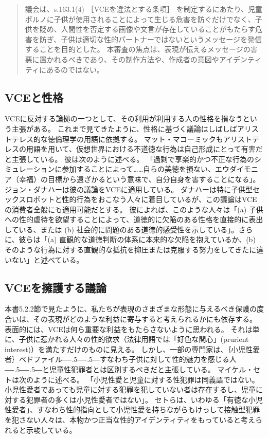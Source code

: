 \documentclass[paper=a4,book,openany]{jlreq}
\def\DDASH{―\kern-.5\zw―\kern-.5\zw―} %
\begin{document}
\begin{quote}
議会は、s.163.1(4) ［VCEを違法とする条項］ を制定するにあたり、児童ポルノに子供が使用されることによって生じる危害を防ぐだけでなく、子供を貶め、人間性を否定する画像や文言が存在していることがもたらす危害を防ぎ、子供は適切な性的パートナーではないというメッセージを発信することを目的とした。
本審査の焦点は、表現が伝えるメッセージの害悪に置かれるべきであり、その制作方法や、作成者の意図やアイデンティティにあるのではない。
\end{quote}

\subsection{VCEと性格}

VCEに反対する論拠の一つとして、その利用が利用する人の性格を損なうという主張がある。
これまで見てきたように、性格に基づく議論はしばしばアリストテレス的な徳倫理学の用語に依拠する。
マット・マコーミックもアリストテレスの用語を用いて、仮想世界における不道徳な行為は自己形成にとって有害だと主張している。
彼は次のように述べる。
「過剰で享楽的かつ不正な行為のシミュレーションに参加することによって……自らの美徳を損ない、エウダイモニア（幸福）の目標から遠ざかるという意味で、自分自身を害することになる」\citep[p.278]{mccormick01:_is_it_wrong_play_violen_video_games}。
ジョン・ダナハーは彼の議論をVCEに適用している。
ダナハーは特に子供型セックスロボットと性的行為をおこなう人々に着目しているが、この議論はVCEの消費者全般にも適用可能だとする。
彼によれば、このような人々は「(a) 子供への性的虐待を欲望することによって、道徳的に欠陥のある性格を直接的に表出している、または (b) 社会的に問題のある道徳的感受性を示している」。さらに、彼らは「(a) 直観的な道徳判断の体系に本来的な欠陥を抱えているか、(b) そのような行為に対する直観的な抵抗を抑圧または克服する努力をしてきたに違いない」と述べている\citep[p.86]{danaher17:_robot_rape_robot_child_sexual_abuse}。

\subsection{VCEを擁護する議論}

本書5.2.2節で見たように、私たちが表現のさまざまな形態に与えるべき保護の度合いは、その表現がどのような利益に寄与すると考えられるかにも依存する。
表面的には、VCEは何ら重要な利益をもたらさないように思われる。
それは単に、子供に惹かれる人々の性的欲求（法律用語では「好色な関心」(prurient interest)）を満たすだけのものに見える。
しかし、一部の専門家は、｛小児性愛者｝{ペドファイル}{\DDASH}すなわち子供に対して性的魅力を感じる人{\DDASH}と児童性犯罪者とは区別するべきだと主張している。
マイケル・セトは次のように述べる。
「小児性愛と児童に対する性犯罪は同義語ではない。
小児性愛者であっても児童に対する犯罪を犯していない者は存在するし、児童に対する犯罪者の多くは小児性愛者ではない」\citep{apabooks18:_michael_c}。
セトらは、いわゆる「有徳な小児性愛者」、すなわち性的指向として小児性愛を持ちながらもけっして接触型犯罪を犯さない人々は、本物かつ正当な性的アイデンティティをもっていると考えられると示唆している\citep{seto12:_is_pedop_sexual_orien}。
\end{document}
